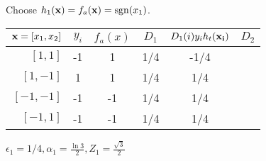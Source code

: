 \vspace{0.2in}
 Choose $h_1({\bf x}) = f_a({\bf x}) = \operatorname{sgn}(x_1)$.

\begin{center}
  \begin{tabular}{rccccc}
    \toprule
    ${\bf x} = [x_1,x_2]$ & $y_i$ & $f_a(x)$ & $D_1$ & $D_{1}(i)y_{i}h_t({\bf x_i})$ & $D_2$ \\
    \midrule
    $[1,  1]$                 & -1    & 1        & 1/4   & -1/4                          &       \\
    $[1, -1]$                & 1     & 1        & 1/4   & 1/4                           &       \\
    $[-1,-1]$               & -1    & -1       & 1/4   & 1/4                           &       \\
    $[-1, 1]$                & -1    & -1       & 1/4   & 1/4                           &       \\
    \bottomrule
  \end{tabular}
\end{center}

$\epsilon_1 = 1/4, \alpha_1 = \frac{\ln3}{2}, Z_1 = \frac{\sqrt{3}}{2}$

